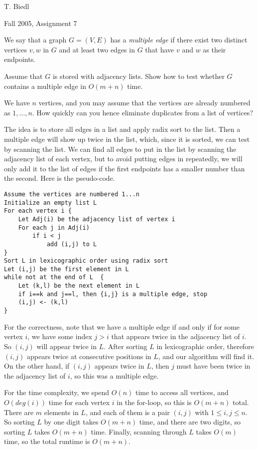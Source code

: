 \begin{authorship}
T. Biedl
\end{authorship}
\begin{usage}
Fall 2005, Assignment 7
\end{usage}

We say that a graph $G=(V,E)$ has a {\em multiple edge} if there
exist two distinct vertices $v,w$ in $G$ and at least two edges
in $G$ that have $v$ and $w$ as their endpoints.

Assume that $G$ is stored with adjacency lists.  Show how to test
whether $G$ contains a multiple edge in $O(m+n)$ time.

\begin{hint}
We have $n$ vertices, and you may assume that the vertices are 
already numbered as $1,\dots,n$.  How quickly can you hence
eliminate duplicates from a list of vertices?
\end{hint}

\begin{solution}
The idea is to store all edges in a list and apply radix sort to
the list.  Then a multiple edge will show up twice in the list, which,
since it is sorted, we can test by scanning the list.  We can find all
edges to put in the list by scanning the adjacency list of each vertex,
but to avoid putting edges in repeatedly, we will only add it to the
list of edges if the first endpoints has a smaller number than the second.
Here is the
pseudo-code.

\begin{verbatim}
Assume the vertices are numbered 1...n
Initialize an empty list L
For each vertex i {
    Let Adj(i) be the adjacency list of vertex i
    For each j in Adj(i)
        if i < j
            add (i,j) to L
}
Sort L in lexicographic order using radix sort
Let (i,j) be the first element in L
while not at the end of L  {
    Let (k,l) be the next element in L
    if i==k and j==l, then {i,j} is a multiple edge, stop
    (i,j) <- (k,l)
}
\end{verbatim}

For the correctness, note that we have a multiple edge if and only
if for some vertex $i$, we have some index $j>i$ that appears
twice in the adjacency list of $i$.  So $(i,j)$ will appear twice in
$L$. After sorting $L$ in lexicographic order, therefore $(i,j)$ appears
twice at consecutive positions in $L$, and our algorithm will find it.
On the other hand, if $(i,j)$ appears twice in $L$, then $j$ must have
been twice in the adjacency list of $i$, so this was a multiple edge. 

For the time complexity, we spend $O(n)$ time to access all vertices,
and $O(deg(i))$ time for each vertex $i$ in the for-loop, so this is $O(m+n)$
total.  There are $m$ elements in $L$, and each of them is a pair $(i,j)$
with $1\leq i,j\leq n$.  So sorting $L$ by one digit takes $O(m+n)$ time,
and there are two digits, so sorting $L$ takes $O(m+n)$ time.  Finally,
scanning through $L$ takes $O(m)$ time, so the total runtime is $O(m+n)$.
\end{solution}


